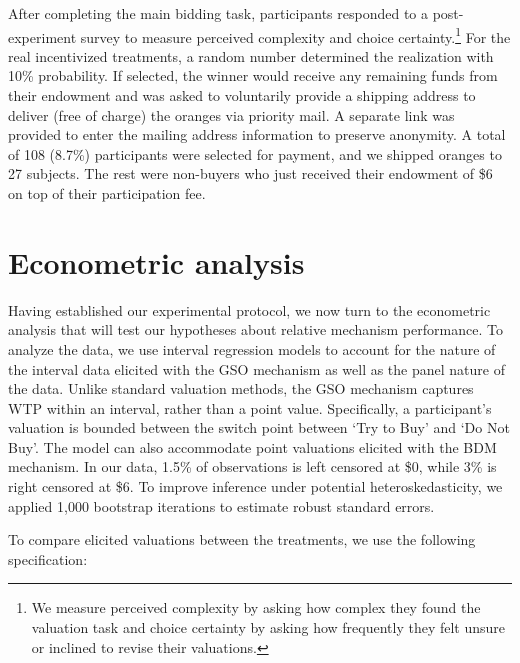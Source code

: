 \documentclass[12pt]{article}
\begin{document}
After completing the main bidding task, participants responded to a post-experiment survey to measure perceived complexity and choice certainty.\footnote{We measure perceived complexity by asking how complex they found the valuation task and choice certainty by asking how frequently they felt unsure or inclined to revise their valuations.} For the real incentivized treatments, a random number determined the realization with 10\% probability.  If selected, the winner would receive any remaining funds from their endowment and was asked to voluntarily provide a shipping address to deliver (free of charge) the oranges via priority mail. A separate link was provided to enter the mailing address information to preserve anonymity. A total of 108 (8.7\%) participants were selected for payment, and we shipped oranges to 27 subjects. The rest were non-buyers who just received their endowment of \$6 on top of their participation fee. 



\section{Econometric analysis}
\label{Econometric}
Having established our experimental protocol, we now turn to the econometric analysis that will test our hypotheses about relative mechanism performance. To analyze the data, we use interval regression models to account for the nature of the interval data elicited with the GSO mechanism as well as the panel nature of the data. Unlike standard valuation methods, the GSO mechanism captures WTP within an interval, rather than a point value. Specifically, a participant's valuation is bounded between the switch point between `Try to Buy' and `Do Not Buy'. The model can also accommodate point valuations elicited with the BDM mechanism. In our data, 1.5\% of observations is left censored at \$0, while 3\% is right censored at \$6. To improve inference under potential heteroskedasticity, we applied 1,000 bootstrap iterations to estimate robust standard errors.

To compare elicited valuations between the treatments, we use the following specification:
\vspace{-1cm}
\end{document}
